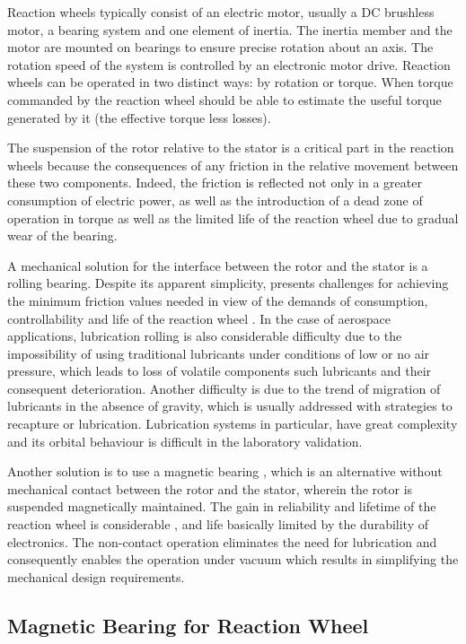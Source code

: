 \documentclass[journal,a4paper,oneside,twocolumn]{IEEEtran}
\begin{document}
Reaction wheels typically consist of an electric motor, usually a DC brushless motor, a bearing system and one element of inertia. The inertia member and the motor are mounted on bearings to ensure precise rotation about an axis. The rotation speed of the system is controlled by an electronic motor drive. Reaction wheels can be operated in two distinct ways: by rotation or torque. When torque commanded by the reaction wheel should be able to estimate the useful torque generated by it (the effective torque less losses).

The suspension of the rotor relative to the stator is a critical part in the reaction wheels \cite{taniwaki2003experimental} because the consequences of any friction in the relative movement between these two components. Indeed, the friction is reflected not only in a greater consumption of electric power, as well as the introduction of a dead zone of operation in torque as well as the limited life of the reaction wheel due to gradual wear of the bearing.

A  mechanical solution for the interface between the rotor and the stator is a rolling bearing. Despite its apparent simplicity, presents challenges for achieving the minimum friction values needed in view of the demands of consumption, controllability and life of the reaction wheel \cite{Krishnan2010}. In the case of aerospace applications, lubrication rolling is also considerable difficulty due to the impossibility of using traditional lubricants under conditions of low or no air pressure, which leads to loss of volatile components such lubricants and their consequent deterioration. Another difficulty is due to the trend of migration of lubricants in the absence of gravity, which is usually addressed with strategies to recapture or lubrication. Lubrication systems in particular, have great complexity and its orbital behaviour is difficult in the laboratory validation.

Another solution is to use a magnetic bearing \cite{Bangcheng2012}, which is an alternative without mechanical contact between the rotor and the stator, wherein the rotor is suspended magnetically maintained. The gain in reliability and lifetime of the reaction wheel is considerable \cite{Marble2006}, and life basically limited by the durability of electronics. The non-contact operation eliminates the need for lubrication and consequently enables the operation under vacuum which results in simplifying the mechanical design requirements.

\subsection{Magnetic Bearing for Reaction Wheel}
\end{document}
